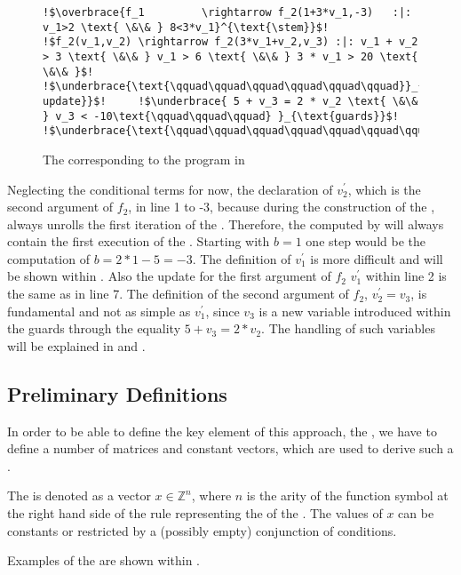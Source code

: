 \begin{figure}[H]	
	\begin{lstlisting}[linewidth=1.2\textwidth, escapechar = !]
!$\overbrace{f_1	     \rightarrow f_2(1+3*v_1,-3)   :|: v_1>2 \text{ \&\& } 8<3*v_1}^{\text{\stem}}$!
!$f_2(v_1,v_2) \rightarrow f_2(3*v_1+v_2,v_3) :|: v_1 + v_2 > 3 \text{ \&\& } v_1 > 6 \text{ \&\& } 3 * v_1 > 20 \text{ \&\& }$!
!$\underbrace{\text{\qquad\qquad\qquad\qquad\qquad\qquad}}_{\text{linear update}}$!		!$\underbrace{ 5 + v_3 = 2 * v_2 \text{ \&\& } v_3 < -10\text{\qquad\qquad\qquad} }_{\text{guards}}$!
!$\underbrace{\text{\qquad\qquad\qquad\qquad\qquad\qquad\qquad\qquad\qquad\qquad\qquad\qquad\qquad\qquad\qquad\qquad}}_{\text{\loopt}}$!
	\end{lstlisting}

	\caption{The \its corresponding to the  program in }
	\label{fig:structure-example-TRS}
\end{figure}
 Neglecting the conditional terms for now, the declaration of $v^\prime_2$, which is the second argument of $f_2$, in line 1 to -3, 
 because during the construction of the \seg, \aprove always unrolls the first iteration of the \loopt. Therefore, the \stem computed by \aprove will always contain the first execution of the \loopt. Starting with $b=1$ one step would be the computation of $b = 2*1-5=-3$. The definition of $v^\prime_1$ is more difficult and will be shown within .
Also the update for the first argument of $f_2$ $v^\prime_1$ within line 2 is the same as in  line 7. The definition of the second argument of $f_2$, $v^\prime_2 = v_3$, is fundamental and not as simple as $v^\prime_1$, since $v_3$ is a new variable introduced within the guards through the equality $5+v_3=2*v_2$. The handling of such variables will be explained in  and . \newline

\subsection{Preliminary Definitions}
In order to be able to define the key element of this approach, the \gna, we have to define a number of matrices and constant vectors, which are used to derive such a \gna. 

\begin{definition}[\stem]
	The \stem is denoted as a vector $x \in \mathbb{Z}^n$, where $n$ is the arity of the function symbol at the right hand side of the rule representing the \stem of the \its. The values of $x$ can be constants or restricted by a (possibly empty) conjunction of conditions. 
\end{definition}
Examples of the \stem are shown within .

